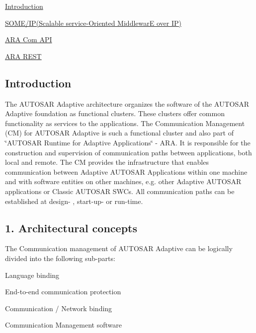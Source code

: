 \begin{DoxyItemize}
\item \hyperlink{adaptive_communicationmanagement_introduction}{Introduction}
\item \hyperlink{adaptive_communicationmanagement_someip}{S\+O\+M\+E/\+IP(Scalable service-\/\+Oriented MiddlewarE over IP)}
\item \hyperlink{adaptive_communicationmanagement_aracom}{A\+RA Com A\+PI}
\item \hyperlink{adaptive_communicationmanagement_ararest}{A\+RA R\+E\+ST} 
\end{DoxyItemize}\hypertarget{adaptive_communicationmanagement_introduction}{}\subsection{Introduction}\label{adaptive_communicationmanagement_introduction}
The A\+U\+T\+O\+S\+AR Adaptive architecture organizes the software of the A\+U\+T\+O\+S\+AR Adaptive foundation as functional clusters. These clusters offer common functionality as services to the applications. The Communication Management (CM) for A\+U\+T\+O\+S\+AR Adaptive is such a functional cluster and also part of \char`\"{}\+A\+U\+T\+O\+S\+A\+R Runtime for Adaptive Applications\char`\"{} -\/ A\+RA. It is responsible for the construction and supervision of communication paths between applications, both local and remote. The CM provides the infrastructure that enables communication between Adaptive A\+U\+T\+O\+S\+AR Applications within one machine and with software entities on other machines, e.\+g. other Adaptive A\+U\+T\+O\+S\+AR applications or Classic A\+U\+T\+O\+S\+AR S\+W\+Cs. All communication paths can be established at design-\/ , start-\/up-\/ or run-\/time.

 \subsection*{1. Architectural concepts}

The Communication management of A\+U\+T\+O\+S\+AR Adaptive can be logically divided into the following sub-\/parts\+:
\begin{DoxyEnumerate}
\item Language binding
\item End-\/to-\/end communication protection
\item Communication / Network binding
\item Communication Management software
\end{DoxyEnumerate}

